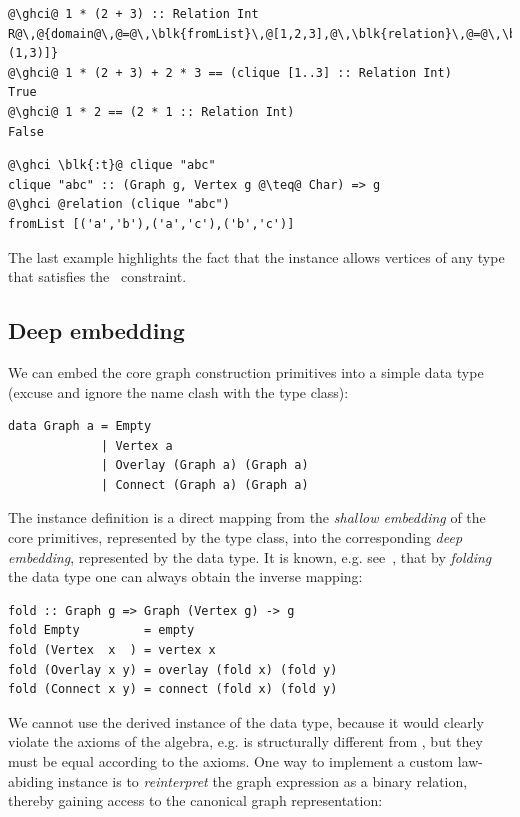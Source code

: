 \vspace{1mm}
\begin{verbatim}
@\ghci@ 1 * (2 + 3) :: Relation Int
R@\,@{domain@\,@=@\,\blk{fromList}\,@[1,2,3],@\,\blk{relation}\,@=@\,\blk{fromList}\,@[(1,2),(1,3)]}
@\ghci@ 1 * (2 + 3) + 2 * 3 == (clique [1..3] :: Relation Int)
True
@\ghci@ 1 * 2 == (2 * 1 :: Relation Int)
False
\end{verbatim}
\begin{verbatim}
@\ghci \blk{:t}@ clique "abc"
clique "abc" :: (Graph g, Vertex g @\teq@ Char) => g
@\ghci @relation (clique "abc")
fromList [('a','b'),('a','c'),('b','c')]
\end{verbatim}

\noindent
The last example highlights the fact that the  instance allows vertices
of any type  that satisfies the~ constraint.

\subsection{Deep embedding}\label{sub-embedding}

We can embed the core graph construction primitives into a simple data type
(excuse and ignore the name clash with the type class):

\begin{verbatim}
data Graph a = Empty
             | Vertex a
             | Overlay (Graph a) (Graph a)
             | Connect (Graph a) (Graph a)
\end{verbatim}

The instance definition is a direct mapping from the \emph{shallow embedding}
of the core primitives, represented by the type class, into the
corresponding \emph{deep embedding}, represented by the data type.
It is known, e.g. see~\citet{2014_gibbons_folding}, that by \emph{folding} the data
type one can always obtain the inverse mapping:

\begin{verbatim}
fold :: Graph g => Graph (Vertex g) -> g
fold Empty         = empty
fold (Vertex  x  ) = vertex x
fold (Overlay x y) = overlay (fold x) (fold y)
fold (Connect x y) = connect (fold x) (fold y)
\end{verbatim}

We cannot use the derived  instance of the  data type, because it
would clearly violate the axioms of the algebra, e.g.  is
structurally different from , but they must be equal according to the axioms.
One way to implement a custom law-abiding  instance is to \emph{reinterpret}
the graph expression as a binary relation, thereby gaining access to the canonical
graph representation:

